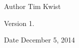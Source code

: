 \begin{DoxyAuthor}{Author}
Tim Kwist 
\end{DoxyAuthor}
\begin{DoxyVersion}{Version}
1. 
\end{DoxyVersion}
\begin{DoxyDate}{Date}
December 5, 2014 
\end{DoxyDate}
